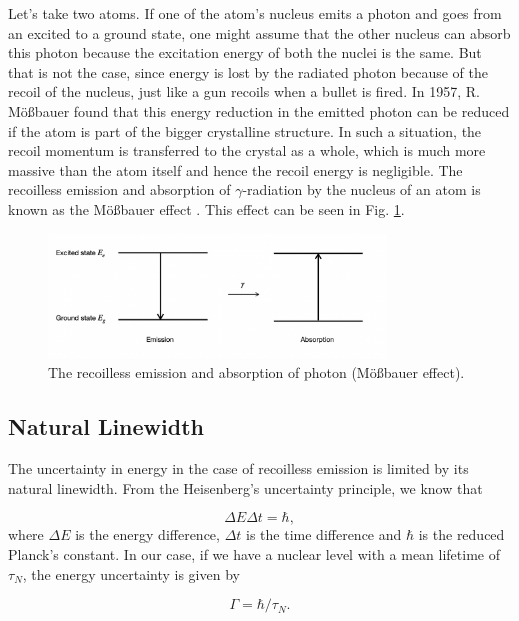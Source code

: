 \documentclass[a4paper]{report}
\numberwithin{equation}{section}
\begin{document}
Let's take two atoms. If one of the atom's nucleus emits a photon and goes from an excited to a ground state, one might assume that the other nucleus can absorb this photon because the excitation energy of both the nuclei is the same. But that is not the case, since energy is lost by the radiated photon because of the recoil of the nucleus, just like a gun recoils when a bullet is fired. In 1957, R. M\"o{\ss}bauer found that this energy reduction in the emitted photon can be reduced if the atom is part of the bigger crystalline structure. In such a situation, the recoil momentum is transferred to the crystal as a whole, which is much more massive than the atom itself and hence the recoil energy is negligible. The recoilless emission and absorption of $\gamma $-radiation by the nucleus of an atom is known as the M\"o{\ss}bauer effect \cite{Schatz1996}. This effect can be seen in Fig. \ref{fig:moess}.

\begin{figure}[htpb]
    \centering
    \includegraphics[width=0.8\textwidth]{moessbauer-effect}
    \caption{The recoilless emission and absorption of photon (M\"o{\ss}bauer effect).}
    \label{fig:moess}
\end{figure}

\subsection{Natural Linewidth}
The uncertainty in energy in the case of recoilless emission is limited by its natural linewidth. From the Heisenberg's uncertainty principle, we know that 

\begin{equation}
		\Delta E \Delta t = \hbar,
\end{equation}
where $\Delta E $ is the energy difference, $\Delta t$ is the time difference and $\hbar $ is the reduced Planck's constant. In our case, if we have a nuclear level with a mean lifetime of $\tau _{N}$, the energy uncertainty is given by

\begin{equation} \label{eqn:uncertainty}
		\Gamma = \hbar / \tau _{N}.	
\end{equation}
\end{document}
